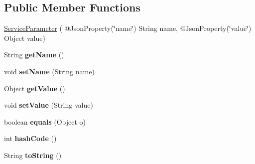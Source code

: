 \subsection*{Public Member Functions}
\begin{DoxyCompactItemize}
\item 
\hyperlink{classeu_1_1h2020_1_1symbiote_1_1enabler_1_1messaging_1_1model_1_1ServiceParameter_ad0e019c88a6d0eca078c327c39ba7217}{Service\+Parameter} ( @Json\+Property(\char`\"{}name\char`\"{}) String name, @Json\+Property(\char`\"{}value\char`\"{}) Object value)
\item 
\mbox{\label{classeu_1_1h2020_1_1symbiote_1_1enabler_1_1messaging_1_1model_1_1ServiceParameter_a704cd5e91081210585e2ddc0e21f949f}} 
String {\bfseries get\+Name} ()
\item 
\mbox{\label{classeu_1_1h2020_1_1symbiote_1_1enabler_1_1messaging_1_1model_1_1ServiceParameter_a6240e33167d5db63d3877052f80a8cd5}} 
void {\bfseries set\+Name} (String name)
\item 
\mbox{\label{classeu_1_1h2020_1_1symbiote_1_1enabler_1_1messaging_1_1model_1_1ServiceParameter_a239adcb6c61b3a5cf6952aa1044a39fa}} 
Object {\bfseries get\+Value} ()
\item 
\mbox{\label{classeu_1_1h2020_1_1symbiote_1_1enabler_1_1messaging_1_1model_1_1ServiceParameter_a3b8427c79943b73f1d232fa9f2b7111c}} 
void {\bfseries set\+Value} (String value)
\item 
\mbox{\label{classeu_1_1h2020_1_1symbiote_1_1enabler_1_1messaging_1_1model_1_1ServiceParameter_ab13e9083e9ab5573a2b02a63607dd111}} 
boolean {\bfseries equals} (Object o)
\item 
\mbox{\label{classeu_1_1h2020_1_1symbiote_1_1enabler_1_1messaging_1_1model_1_1ServiceParameter_a089d6e043b74208cf206356d3c168df5}} 
int {\bfseries hash\+Code} ()
\item 
\mbox{\label{classeu_1_1h2020_1_1symbiote_1_1enabler_1_1messaging_1_1model_1_1ServiceParameter_a2354c398b2ac71f499fd6228f4634d1c}} 
String {\bfseries to\+String} ()
\end{DoxyCompactItemize}


